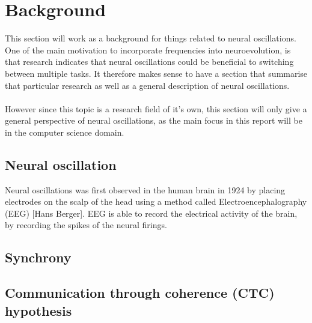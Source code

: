 %
\section{Background}
This section will work as a background for things related to neural oscillations. One of the main motivation to incorporate frequencies into neuroevolution, is that research indicates that neural oscillations could be beneficial to switching between multiple tasks. It therefore makes sense to have a section that summarise that particular research as well as a general description of neural oscillations.
\\
\\
However since this topic is a research field of it's own, this section will only give a general perspective of neural oscillations, as the main focus in this report will be in the computer science domain.
\subsection{Neural oscillation}
Neural oscillations was first observed in the human brain in 1924 by placing electrodes on the scalp of the head using a method called Electroencephalography (EEG) [Hans Berger]. EEG is able to record the electrical activity of the brain, by recording the spikes of the neural firings.
\subsection{Synchrony}
\subsection{Communication through coherence (CTC) hypothesis}
\newpage
